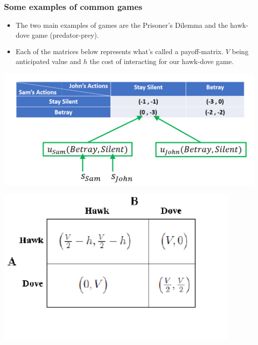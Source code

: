 \documentclass[aspectratio=169, handout]{beamer}
\begin{document}
\begin{frame}
  \frametitle{Some examples of common games}
  \begin{itemize}
      \item The two main examples of games are the Prisoner's Dilemma and the hawk-dove game (predator-prey).
      \pause 
      \item Each of the matrices below represents what's called a payoff-matrix. $V$ being anticipated value and $h$ the cost of interacting for our hawk-dove game.
  \end{itemize}
    \begin{minipage}[t]{0.50\textwidth}
        \includegraphics[width=\textwidth]{pictures/prisoners_dilemma_2.png}
    \end{minipage}
    \begin{minipage}[t]{0.45\textwidth}
        \includegraphics[width=\textwidth]{pictures/hawk_dove_payoff.png}
    \end{minipage}
\end{frame}
\end{document}
